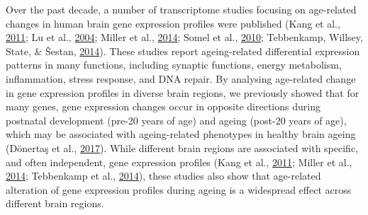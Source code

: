 \documentclass[12pt,twoside]{unicam}
\begin{document}
Over the past decade, a number of transcriptome studies focusing on age-related changes in human brain gene expression profiles were published (Kang et al., \protect\hyperlink{ref-Kang2011}{2011}; Lu et al., \protect\hyperlink{ref-Lu2004}{2004}; Miller et al., \protect\hyperlink{ref-Miller2014}{2014}; Somel et al., \protect\hyperlink{ref-Somel2010}{2010}; Tebbenkamp, Willsey, State, \& Šestan, \protect\hyperlink{ref-Tebbenkamp2014}{2014}). These studies report ageing-related differential expression patterns in many functions, including synaptic functions, energy metabolism, inflammation, stress response, and DNA repair. By analysing age-related change in gene expression profiles in diverse brain regions, we previously showed that for many genes, gene expression changes occur in opposite directions during postnatal development (pre-20 years of age) and ageing (post-20 years of age), which may be associated with ageing-related phenotypes in healthy brain ageing (Dönertaş et al., \protect\hyperlink{ref-Donertas2017}{2017}). While different brain regions are associated with specific, and often independent, gene expression profiles (Kang et al., \protect\hyperlink{ref-Kang2011}{2011}; Miller et al., \protect\hyperlink{ref-Miller2014}{2014}; Tebbenkamp et al., \protect\hyperlink{ref-Tebbenkamp2014}{2014}), these studies also show that age-related alteration of gene expression profiles during ageing is a widespread effect across different brain regions.
\end{document}
